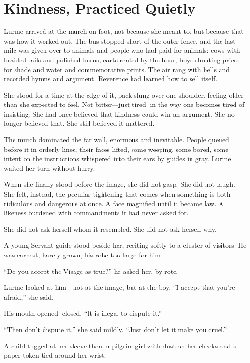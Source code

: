 \section*{Kindness, Practiced Quietly}

Lurine arrived at the murch on foot, not because she meant to, but because that was how it worked out. The bus stopped short of the outer fence, and the last mile was given over to animals and people who had paid for animals: cows with braided tails and polished horns, carts rented by the hour, boys shouting prices for shade and water and commemorative prints. The air rang with bells and recorded hymns and argument. Reverence had learned how to sell itself.

She stood for a time at the edge of it, pack slung over one shoulder, feeling older than she expected to feel. Not bitter---just tired, in the way one becomes tired of insisting. She had once believed that kindness could win an argument. She no longer believed that. She still believed it mattered.

The murch dominated the far wall, enormous and inevitable. People queued before it in orderly lines, their faces lifted, some weeping, some bored, some intent on the instructions whispered into their ears by guides in gray. Lurine waited her turn without hurry.

When she finally stood before the image, she did not gasp. She did not laugh. She felt, instead, the peculiar tightening that comes when something is both ridiculous and dangerous at once. A face magnified until it became law. A likeness burdened with commandments it had never asked for.

She did not ask herself whom it resembled.
She did not ask herself why.

A young Servant guide stood beside her, reciting softly to a cluster of visitors. He was earnest, barely grown, his robe too large for him.

``Do you accept the Visage as true?'' he asked her, by rote.

Lurine looked at him---not at the image, but at the boy. ``I accept that you're afraid,'' she said.

His mouth opened, closed. ``It is illegal to dispute it.''

``Then don't dispute it,'' she said mildly. ``Just don't let it make you cruel.''

A child tugged at her sleeve then, a pilgrim girl with dust on her cheeks and a paper token tied around her wrist.

